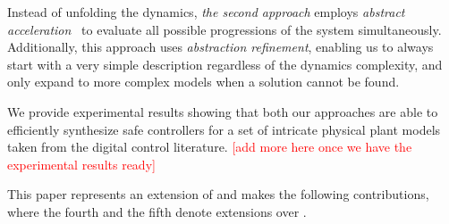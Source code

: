 \documentclass[twocolumn]{autart}    %
\newcommand{\addtodo}[1]{\textcolor{red}{[#1]}}
\begin{document}
Instead of unfolding the dynamics, {\em the second approach}
employs {\em abstract acceleration}~\cite{cattaruzza2015unbounded} to
evaluate all possible progressions of the system simultaneously. 
Additionally, this approach uses {\em abstraction refinement},
enabling us to always start with a very simple description regardless of the
dynamics complexity, and only expand to more complex models
when a solution cannot be found.

We provide experimental results showing that both our approaches are able to
efficiently synthesize safe controllers for a set of intricate physical
plant models taken from the digital control literature.
\addtodo{add more here once we have the experimental results ready}

This paper represents an extension of \cite{DBLP:conf/cav/AbateBCCDKKP17}
and makes the following contributions, where the fourth and the fifth denote
extensions over \cite{DBLP:conf/cav/AbateBCCDKKP17}.
%
\end{document}
